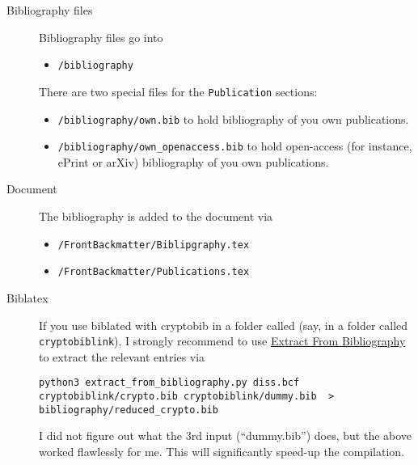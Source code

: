 \begin{description}
	\item [Bibliography files] Bibliography files go into 
	\begin{itemize}
		\item \lstinline{/bibliography}
	\end{itemize}
		There are two special files for the \lstinline{Publication} sections:

	\begin{itemize}
		\item \lstinline{/bibliography/own.bib} to hold bibliography of you own publications.
		\item \lstinline{/bibliography/own_openaccess.bib} to hold open-access (for instance, ePrint or arXiv) bibliography of you own publications.
	\end{itemize}
	\item[Document] The bibliography is added to the document via 
	\begin{itemize}
		\item \lstinline{/FrontBackmatter/Biblipgraphy.tex}
		\item \lstinline{/FrontBackmatter/Publications.tex}
	\end{itemize}
	\item [Biblatex] If you use biblated with cryptobib in a folder called (say, in a folder called \lstinline{cryptobiblink}), I strongly recommend to use 
	\href{https://github.com/thomwiggers/extract_from_bibliography/blob/main/extract_from_bibliography.py}{Extract From Bibliography}
	to extract the relevant entries via 

	\begin{lstlisting}[breaklines=true]
	python3 extract_from_bibliography.py diss.bcf cryptobiblink/crypto.bib cryptobiblink/dummy.bib  > bibliography/reduced_crypto.bib
	\end{lstlisting}
	I did not figure out what the 3rd input (``dummy.bib'') does, but the above worked flawlessly for me. 
	This will significantly speed-up the compilation.
\end{description}


